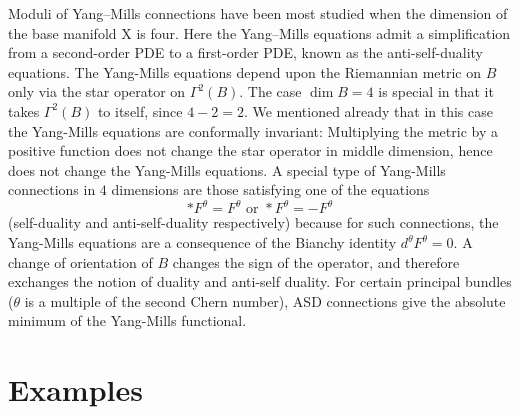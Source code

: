 \documentclass{article}
\theoremstyle{definition}
\begin{document}
    
    Moduli of Yang–Mills connections have been most studied when the dimension of the base manifold X is four. Here the Yang–Mills equations admit a simplification from a second-order PDE to a first-order PDE, known as the anti-self-duality equations. The Yang-Mills equations depend upon the Riemannian metric on $B$ only via the star operator on $\Gamma^2 (B)$. The case $\dim B = 4$ is special in that it takes $\Gamma^2 (B)$ to itself, since $4 - 2 = 2$. We mentioned already that in this case the Yang-Mills equations are conformally invariant: Multiplying the metric by a positive function does not change the star operator in middle dimension, hence does not change the Yang-Mills equations. A special type of Yang-Mills connections in $4$ dimensions are those satisfying one of the equations 
    \[
        *F^\theta = F^\theta \text{\ \ or \ \  }  *F^\theta = - F^\theta 
    \]
    (self-duality and anti-self-duality respectively) because for such connections, the Yang-Mills equations are a consequence of the Bianchy identity $d^\theta F^\theta = 0$. A change of orientation of $B$ changes the sign of the  operator, and therefore exchanges the notion of duality and anti-self duality. For certain principal bundles ($\theta$ is a multiple of the second Chern number), ASD connections give the absolute minimum of the Yang-Mills functional.
    
    
    

\section{Examples}

\end{document}
